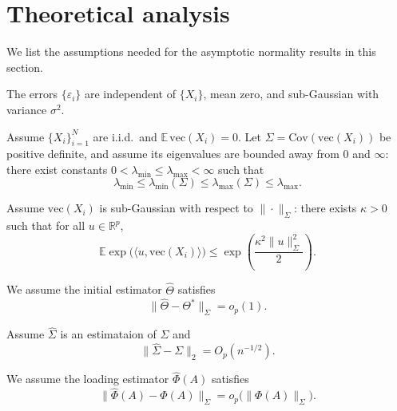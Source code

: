 \documentclass[authoryear,preprint,review,12pt]{elsarticle}
\begin{document}
	\section{Theoretical analysis}\label{sec:inference}
	We list the assumptions needed for the asymptotic normality results in this section.
	\begin{assumption}[Noise]
		\label{cond:noise}
		The errors $\{\varepsilon_i\}$ are independent of $\{X_i\}$, mean zero, and sub-Gaussian with variance $\sigma^2$.
	\end{assumption} 
	
	\begin{assumption}
		\label{cond:cov}
		Assume $\{X_i\}_{i=1}^N$ are i.i.d.\ and $\mathbb{E}\,\mathrm{vec}(X_i)=0$.
		Let $\Sigma=\mathrm{Cov}(\mathrm{vec}(X_i))$ be positive definite, and assume
		its eigenvalues are bounded away from $0$ and $\infty$: there exist constants
		$0<\lambda_{\min}\le \lambda_{\max}<\infty$ such that
		\[
		\lambda_{\min} \le \lambda_{\min}(\Sigma)\le \lambda_{\max}(\Sigma)\le \lambda_{\max}.
		\] 
	\end{assumption}
	
	\begin{assumption}
		\label{cond:design_general_vec}
		Assume $\mathrm{vec}(X_i)$ is sub-Gaussian with respect to $\|\cdot\|_\Sigma$:
		there exists $\kappa>0$ such that for all $u\in\mathbb{R}^{p}$,
		\[
		\mathbb{E}\exp\!\big(\langle u,\mathrm{vec}(X_i)\rangle\big)
		\le \exp\!\left(\frac{\kappa^2\|u\|_{\Sigma}^2}{2}\right).
		\]
	\end{assumption}
	
	\begin{assumption}\label{cond:theta_consistency}
		We assume the initial estimator $\widehat{\Theta}$ satisfies
		\[
		\|\widehat{\Theta}-\Theta^\ast\|_{\Sigma}=o_p(1).
		\]
	\end{assumption}
	
	\begin{assumption}\label{cond:Sigmahat_wellcond} Assume $\widehat\Sigma$ is an estimataion of $\Sigma$ and
		\[
		\|\widehat\Sigma - \Sigma\|_2
		=
		O_p(n^{-1/2}).
		\]
	\end{assumption}
	
	\begin{assumption}\label{cond:phi_consistency}
		We assume the loading estimator $\widehat{\Phi}(A)$ satisfies
		\[
		\|\widehat{\Phi}(A)-\Phi(A)\|_{\Sigma}=o_p\!\big(\|\Phi(A)\|_{\Sigma}\big).
		\]
	\end{assumption}
	
\end{document}
